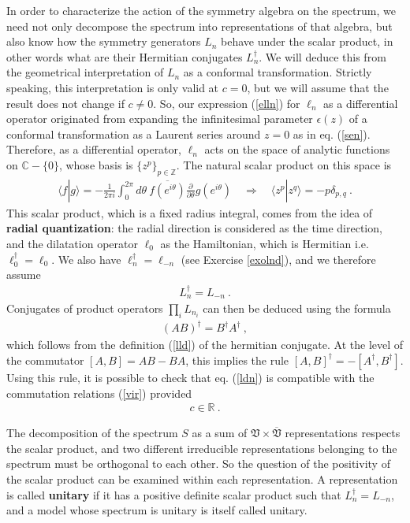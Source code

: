 \documentclass[12pt,a4paper,notitlepage]{report}
\newcommand \Z {\mathbb{Z}}
\newcommand \R {\mathbb{R}}
\newcommand \C {\mathbb{C}}
\newcommand \p {\partial}
\newcommand \pp[1] {{\frac{\p}{\p #1}}}
\numberwithin{equation}{section}
\theoremstyle{break}
\begin{document}
In order to characterize the action of the symmetry algebra on the spectrum, we need not only decompose the spectrum into representations of that algebra, but also know how the symmetry generators $L_n$ behave under the scalar product, in other words what are their Hermitian conjugates $L_n^\dagger$.
We will deduce this from the geometrical interpretation of $L_n$ as a conformal transformation. Strictly speaking, this interpretation is only valid at $c=0$, but we will assume that the result does not change if $c\neq 0$. So, our expression (\ref{elln}) for $\ell_n$ as a differential operator originated from expanding the infinitesimal parameter $\epsilon(z)$ of a conformal transformation as a Laurent series around $z=0$ as in eq. (\ref{sen}). Therefore, as a differential operator, $\ell_n$ acts on the space of analytic functions on $\C-\{0\}$, whose basis is $\{z^p\}_{p\in\Z}$. The natural scalar product on this space is 
\begin{align}
 \langle f|g\rangle = -\frac{1}{2\pi i}\int_0^{2\pi}d\theta\  \overline{f(e^{i\theta})} \pp{\theta} g(e^{i\theta}) \quad \Rightarrow \quad \langle z^p| z^q \rangle = -p\delta_{p,q}\ .
\label{fgd}
\end{align}
This scalar product, which is a fixed radius integral, comes from the idea of \textbf{\boldmath radial quantization}: the radial direction is considered as the time direction, and the dilatation operator $\ell_0$ as the Hamiltonian, which is Hermitian i.e. $\ell_0^\dagger = \ell_0$. We also have $\ell_n^\dagger = \ell_{-n}$ (see Exercise \ref{exolnd}), and we therefore assume
\begin{align}
 \boxed{L^\dagger_n = L_{-n}} \ .
\label{ldn}
\end{align}
Conjugates of product operators $\prod_i L_{n_i}$ can then be deduced using the formula
\begin{align}
 (AB)^\dagger = B^\dagger A^\dagger\ , 
\label{abba}
\end{align}
which follows from the definition (\ref{lld}) of the hermitian conjugate. At the level of the commutator $[A,B]=AB-BA$, this implies
the rule $[A,B]^\dagger = -[A^\dagger,B^\dagger]$. 
Using this rule, it is possible to check that eq. (\ref{ldn}) is compatible with the commutation relations (\ref{vir}) provided
\begin{align}
 c\in \R\ .
\label{cir}
\end{align}

The decomposition of the spectrum $S$ as a sum of $\mathfrak{V}\times \overline{\mathfrak{V}}$ representations respects the scalar product, and two different irreducible representations belonging to the spectrum must be orthogonal to each other. So the question of the positivity of the scalar product can be examined within each representation. A representation is called \textbf{\boldmath unitary} if it has a positive definite scalar product such that 
$L^\dagger_n = L_{-n}$, and a model whose spectrum is unitary is itself called unitary. 
\end{document}
